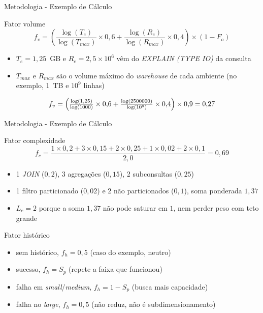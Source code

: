 \documentclass{libs/udl_format}
\begin{document}
\begin{frame}{Metodologia - Exemplo de Cálculo}
  \begin{block}{Fator volume}
    \begin{equation*}
      f_v = \left( \frac{\log(T_e)}{\log(T_{max})} \times 0{,}6 + \frac{\log(R_e)}{\log(R_{max})} \times 0{,}4 \right) \times (1 - F_o)
    \end{equation*}
  \end{block}
  {\small
  \begin{itemize}
    \item $T_e = 1{,}25$~GB e $R_e = 2{,}5 \times 10^{6}$ vêm do \textit{EXPLAIN (TYPE IO)} da consulta
    \item $T_{max}$ e $R_{max}$ são o volume máximo do \textit{warehouse} de cada ambiente (no exemplo, 1~TB e $10^{9}$ linhas)
  \end{itemize}
  \begin{equation*}
    f_v = \Bigl(\tfrac{\log(1{,}25)}{\log(1000)}\times 0{,}6 + \tfrac{\log(2500000)}{\log(10^{9})}\times 0{,}4\Bigr)\times 0{,}9 = 0{,}27
  \end{equation*}
  }
\end{frame}

\begin{frame}{Metodologia - Exemplo de Cálculo}
  \begin{block}{Fator complexidade}
    \begin{equation*}
      f_c = \frac{1\times 0{,}2 + 3\times 0{,}15 + 2\times 0{,}25 + 1\times 0{,}02 + 2\times 0{,}1}{2{,}0} = 0{,}69
    \end{equation*}
    {\small
    \begin{itemize}\setlength{\itemsep}{0.1em}
      \item 1 \textit{JOIN} ($0{,}2$), 3 agregações ($0{,}15$), 2 subconsultas ($0{,}25$)
      \item 1 filtro particionado ($0{,}02$) e 2 não particionados ($0{,}1$), soma ponderada $1{,}37$
      \item $L_c{=}2$ porque a soma $1{,}37$ não pode saturar em $1$, nem perder peso com teto grande
    \end{itemize}}
  \end{block}
  \begin{block}{Fator histórico}
    {\small
    \begin{itemize}\setlength{\itemsep}{0.1em}
      \item sem histórico, $f_h = 0{,}5$ (caso do exemplo, neutro)
      \item sucesso, $f_h = S_p$ (repete a faixa que funcionou)
      \item falha em \textit{small}/\textit{medium}, $f_h = 1 - S_p$ (busca mais capacidade)
      \item falha no \textit{large}, $f_h = 0{,}5$ (não reduz, não é subdimensionamento)
    \end{itemize}}
  \end{block}
\end{frame}
\end{document}
